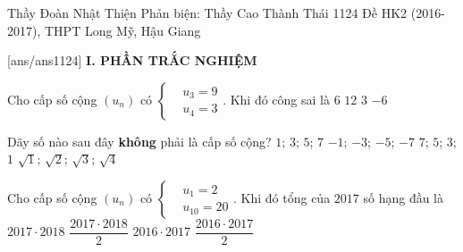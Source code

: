 \begin{name}
{Thầy Đoàn Nhật Thiện \newline Phản biện: Thầy Cao Thành Thái}
{1124 Đề HK2 (2016-2017), THPT Long Mỹ, Hậu Giang}%
	\end{name}
	\setcounter{ex}{0}\setcounter{bt}{0}
	[ans/ans1124]
\noindent\textbf{I. PHẦN TRẮC NGHIỆM}

\begin{ex}%
	Cho cấp số cộng $(u_n)$ có $\left \{ \begin{aligned} &u_3=9\\&u_4=3 \end{aligned} \right.$. Khi đó công sai là
	\choice
	{$6 $}
	{$12 $}
	{$3 $}
	{\True $-6 $}
\end{ex}

\begin{ex}%
	Dãy số nào sau đây \textbf{không} phải là cấp số cộng?
	\choice
	{$1$; $3$; $5$; $7 $}
	{$-1$; $-3$; $-5$; $-7 $}
	{$7$; $5$; $3$; $1 $}
	{\True $\sqrt{1}$; $\sqrt{2}$; $\sqrt{3}$; $\sqrt{4} $}
\end{ex}

\begin{ex}%
	Cho cấp số cộng $(u_n)$ có $\left \{ \begin{aligned} & u_1=2\\ &u_{10}=20 \end{aligned} \right.$. Khi đó tổng của $2017$ số hạng đầu là
	\choice
	{\True $2017\cdot 2018 $}
	{$\dfrac{2017\cdot 2018}{2} $}
	{$2016\cdot 2017 $}
	{$\dfrac{2016\cdot 2017}{2} $}
\end{ex}


